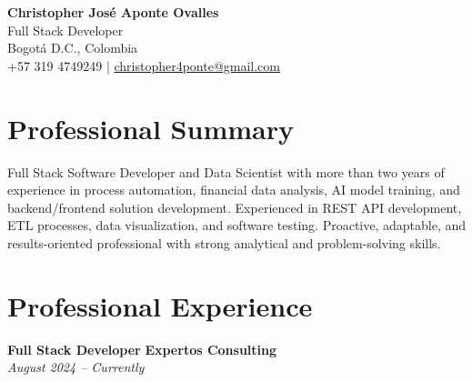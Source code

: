 \documentclass[11pt,a4paper]{article}
\begin{document}
\begin{center}
    {\LARGE \textbf{Christopher José Aponte Ovalles}}\\[5pt]
    {\large Full Stack Developer}\\[6pt]
    Bogotá D.C., Colombia \\
    +57 319 4749249 \quad | \quad
    \href{mailto:christopher4ponte@gmail.com}{christopher4ponte@gmail.com}
\end{center}

\vspace{0.3cm}

\section*{Professional Summary}

Full Stack Software Developer and Data Scientist with more than two years of experience in process automation, financial data analysis, AI model training, and backend/frontend solution development. Experienced in REST API development, ETL processes, data visualization, and software testing. Proactive, adaptable, and results-oriented professional with strong analytical and problem-solving skills.

\section*{Professional Experience}

\textbf{Full Stack Developer} \hfill \textbf{Expertos Consulting}\\
\textit{August 2024 -- Currently}
\end{document}
